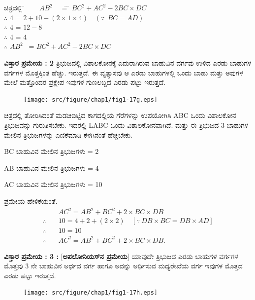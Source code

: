 \begin{tabbing}
 ಚಿತ್ರದಲ್ಲಿ \quad 	\= ~~~ 			$AB^2$~~ \= =  \= $BC^2 + AC^2 - 2 BC \times DC$\\
  $\therefore$ \> \quad $4$ \>  = \> $2+10- (2\times 1 \times 4) \quad (\because  ~~ BC = AD)$\\
   $\therefore$ \> \quad  $4$ \> = \> $12-8$\\
   $\therefore$ \> \quad $4 $ \> = \> $4$ \\
 $\therefore $ \>  $AB^2$~ \> = \> $BC^2 + AC^2 - 2 BC \times DC$
\end{tabbing}

\noindent
\textbf{ವಿಸ್ತಾರ ಪ್ರಮೇಯ : 2}
ತ್ರಿಭುಜದಲ್ಲಿ ವಿಶಾಲಕೋನಕ್ಕೆ ಎದುರಾಗಿರುವ ಬಾಹುವಿನ ವರ್ಗವು ಉಳಿದ ಎರಡು ಬಾಹುಗಳ ವರ್ಗಗಳ ಮೊತ್ತಕ್ಕಿಂತ ಹೆಚ್ಚು. ಇರುತ್ತದೆ. ಈ ವ್ಯತ್ಯಾಸವು ಆ ಎರಡು ಬಾಹುಗಳಲ್ಲಿ ಒಂದು ಬಾಹು ಮತ್ತು ಅವುಗಳ ಮೇಲೆ ಮತ್ತೊಂದರ ಪ್ರಕ್ಷೇಪ ಇವುಗಳ ಗುಣಲಬ್ದದ ಎರಡು ಪಟ್ಟು ಇರುತ್ತದೆ. 
\begin{figure}[H]
\centering
\texttt{[image: src/figure/chap1/fig1-17g.eps]}
\end{figure}

ಚಿತ್ರದಲ್ಲಿ ತೋರಿಸಿದಂತೆ ಮಡಚಿಬಿಟ್ಟಿದ ಕಾಗದಲ್ಲಿಯ ಗೆರೆಗಳನ್ನು ಉಪಯೋಗಿಸಿ ABC ಒಂದು ವಿಶಾಲಕೋನ ತ್ರಿಭುಜವನ್ನು ಗುರುತಿಸಬೇಕು. ಇದರಲ್ಲಿ LABC ಒಂದು ವಿಶಾಲಕೋನವಾಗಿದೆ. ಮತ್ತು ಈ ತ್ರಿಭುಜದ 3 ಬಾಹುಗಳ ಮೇಲಿನ ತ್ರಿಭುಜಗಳನ್ನು ಎಣಿಕೆಮಾಡಿ ಕೆಳಗಿನಂತೆ ಹೆಚ್ಚಬೇಕು.

BC ಬಾಹುವಿನ ಮೇಲಿನ ತ್ರಿಭುಜಗಳು = 2

AB ಬಾಹುವಿನ ಮೇಲಿನ ತ್ರಿಭುಜಗಳು = 4

AC ಬಾಹುವಿನ ಮೇಲಿನ ತ್ರಿಭುಜಗಳು = 10

ಪ್ರಮೇಯ ಹೇಳಿಕೆಯಂತೆ. 
\begin{align*}
& AC^2  = AB^2 + BC^2 +  2 \times BC \times DB\\
\therefore \quad & 10  = 4 +2  + (2 \times 2) \quad [\because ~ DB \times BC = DB \times AD]\\
\therefore \quad & 10  = 10\\
\therefore \quad & AC^2  = AB^2 + BC^2 + 2 \times BC \times DB.
\end{align*}


\noindent
\textbf{ವಿಸ್ತಾರ ಪ್ರಮೇಯ : 3 :} [\textbf{ಅಪಲೋನಿಯಸ್‌ನ ಪ್ರಮೇಯ}]
ಯಾವುದೇ ತ್ರಿಭುಜದ ಎರಡು ಬಾಹುಗಳ ವರ್ಗಗಳ ಮೊತ್ತವು 3 ನೇ ಬಾಹುವಿನ ಅರ್ಧದ ವರ್ಗ ಹಾಗೂ ಅದನ್ನು ಅರ್ಧಿಸುವ ಮಧ್ಯರೇಖೆಯ ವರ್ಗ ಇವುಗಳ ಮೊತ್ತದ ಎರಡು ಪಟ್ಟು ಇರುತ್ತದೆ. 
\begin{figure}[H]
\centering
\texttt{[image: src/figure/chap1/fig1-17h.eps]}
\end{figure}

